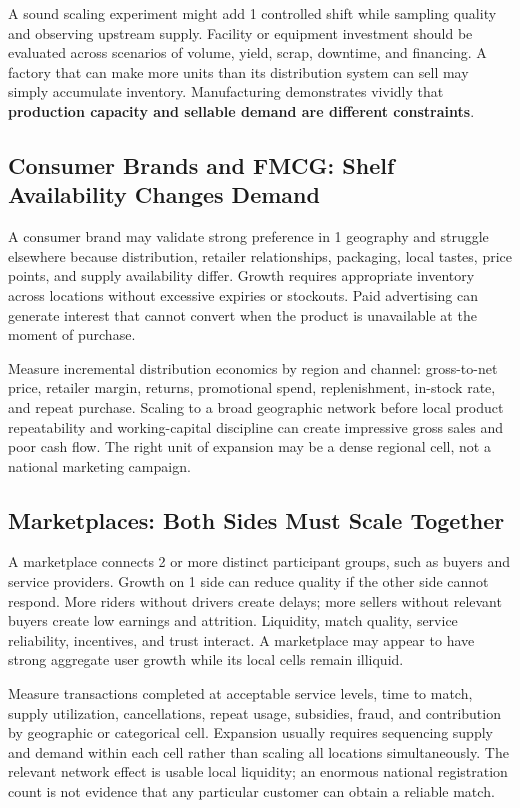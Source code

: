 A sound scaling experiment might add 1 controlled shift while sampling quality and observing upstream supply. Facility or equipment investment should be evaluated across scenarios of volume, yield, scrap, downtime, and financing. A factory that can make more units than its distribution system can sell may simply accumulate inventory. Manufacturing demonstrates vividly that \textbf{production capacity and sellable demand are different constraints}.

\subsection{Consumer Brands and FMCG: Shelf Availability Changes Demand}
\label{sec:consumer_brands_shelf_availability}

A consumer brand may validate strong preference in 1 geography and struggle elsewhere because distribution, retailer relationships, packaging, local tastes, price points, and supply availability differ. Growth requires appropriate inventory across locations without excessive expiries or stockouts. Paid advertising can generate interest that cannot convert when the product is unavailable at the moment of purchase.

Measure incremental distribution economics by region and channel: gross-to-net price, retailer margin, returns, promotional spend, replenishment, in-stock rate, and repeat purchase. Scaling to a broad geographic network before local product repeatability and working-capital discipline can create impressive gross sales and poor cash flow. The right unit of expansion may be a dense regional cell, not a national marketing campaign.

\subsection{Marketplaces: Both Sides Must Scale Together}
\label{sec:marketplaces_both_sides_scale}

A marketplace connects 2 or more distinct participant groups, such as buyers and service providers. Growth on 1 side can reduce quality if the other side cannot respond. More riders without drivers create delays; more sellers without relevant buyers create low earnings and attrition. Liquidity, match quality, service reliability, incentives, and trust interact. A marketplace may appear to have strong aggregate user growth while its local cells remain illiquid.

Measure transactions completed at acceptable service levels, time to match, supply utilization, cancellations, repeat usage, subsidies, fraud, and contribution by geographic or categorical cell. Expansion usually requires sequencing supply and demand within each cell rather than scaling all locations simultaneously. The relevant network effect is usable local liquidity; an enormous national registration count is not evidence that any particular customer can obtain a reliable match.


